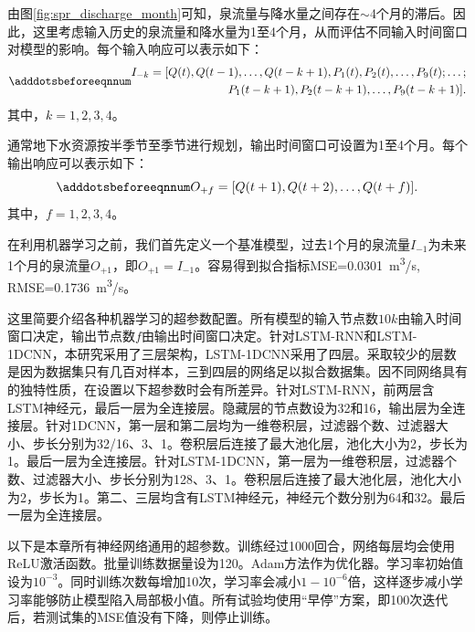 由图\ref{fig:spr_discharge_month}可知，泉流量与降水量之间存在$\sim$4个月的滞后。因此，这里考虑输入历史的泉流量和降水量为1至4个月，从而评估不同输入时间窗口对模型的影响。每个输入响应可以表示如下：
\begin{equation}\adddotsbeforeeqnnum
  \label{eq:spr_input}
  \begin{split}
    I_{-k}=[Q(t),Q(t-1),\ldots,Q(t-k+1),P_1(t),P_2(t),\ldots,P_9(t);\ldots;\\
    P_1(t-k+1),P_2(t-k+1),\ldots,P_9(t-k+1)].
  \end{split}
\end{equation}
其中，$k=1,2,3,4$。

通常地下水资源按半季节至季节进行规划，输出时间窗口可设置为1至4个月。每个输出响应可以表示如下：
\begin{equation}\adddotsbeforeeqnnum
  \label{eq:spr_output}
  O_{+f}=[Q(t+1),Q(t+2),\ldots,Q(t+f)].
\end{equation}
其中，$f=1,2,3,4$。

在利用机器学习之前，我们首先定义一个基准模型，过去1个月的泉流量$I_{-1}$为未来1个月的泉流量$O_{+1}$，即$O_{+1}=I_{-1}$。容易得到拟合指标MSE=\SI{0.0301}{m^{3}/s}, RMSE=\SI{0.1736}{m^{3}/s}。

这里简要介绍各种机器学习的超参数配置。所有模型的输入节点数$10k$由输入时间窗口决定，输出节点数$f$由输出时间窗口决定。针对LSTM-RNN和LSTM-1DCNN，本研究采用了三层架构，LSTM-1DCNN采用了四层。采取较少的层数是因为数据集只有几百对样本，三到四层的网络足以拟合数据集。因不同网络具有的独特性质，在设置以下超参数时会有所差异。针对LSTM-RNN，前两层含LSTM神经元，最后一层为全连接层。隐藏层的节点数设为32和16，输出层为全连接层。针对1DCNN，第一层和第二层均为一维卷积层，过滤器个数、过滤器大小、步长分别为32/16、3、1。卷积层后连接了最大池化层，池化大小为2，步长为1。最后一层为全连接层。针对LSTM-1DCNN，第一层为一维卷积层，过滤器个数、过滤器大小、步长分别为128、3、1。卷积层后连接了最大池化层，池化大小为2，步长为1。第二、三层均含有LSTM神经元，神经元个数分别为64和32。最后一层为全连接层。 

以下是本章所有神经网络通用的超参数。训练经过1000回合，网络每层均会使用ReLU激活函数。批量训练数据量设为120。Adam方法作为优化器。学习率初始值设为$10^{-3}$。同时训练次数每增加10次，学习率会减小$1-10^{-6}$倍，这样逐步减小学习率能够防止模型陷入局部极小值。所有试验均使用“早停”方案，即100次迭代后，若测试集的MSE值没有下降，则停止训练。

